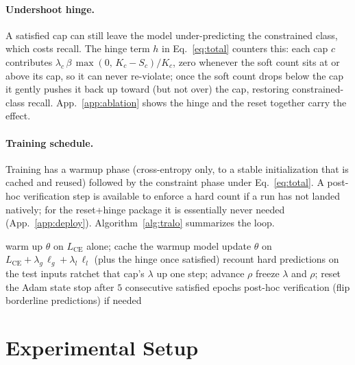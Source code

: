 \documentclass[10pt]{article}
\begin{document}
\paragraph{Undershoot hinge.}
A satisfied cap can still leave the model under-predicting the constrained
class, which costs recall. The hinge term $h$ in Eq.~\eqref{eq:total}
counters this: each cap $c$ contributes
$\lambda_c\,\beta\,\max(0,\,K_c-S_c)/K_c$, zero whenever the soft count sits
at or above its cap, so it can never re-violate; once the soft count drops
below the cap it gently pushes it back up toward (but not over) the cap,
restoring constrained-class recall. App.~\ref{app:ablation} shows the hinge
and the reset together carry the effect.

\paragraph{Training schedule.}
Training has a warmup phase (cross-entropy only, to a stable initialization
that is cached and reused) followed by the constraint phase under
Eq.~\eqref{eq:total}. A post-hoc verification step is available to enforce a
hard count if a run has not landed natively; for the reset+hinge package it
is essentially never needed (App.~\ref{app:deploy}). Algorithm~\ref{alg:tralo}
summarizes the loop.

\begin{algorithm}[t]
\caption{The training loop of the package studied here.}
\label{alg:tralo}
\begin{algorithmic}[1]
\State warm up $\theta$ on $L_{\text{CE}}$ alone; cache the warmup model
  \State update $\theta$ on $L_{\text{CE}} + \lambda_g\,\ell_g + \lambda_l\,\ell_l$ (plus the hinge once satisfied)
  \State recount hard predictions on the test inputs
    \State ratchet that cap's $\lambda$ up one step; advance $\rho$
    \State freeze $\lambda$ and $\rho$; reset the Adam state
  \EndIf
  \State stop after $5$ consecutive satisfied epochs
\EndFor
\State post-hoc verification (flip borderline predictions) if needed
\end{algorithmic}
\end{algorithm}

\section{Experimental Setup}
\label{sec:setup}
\end{document}
